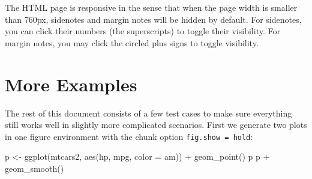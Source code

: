 \documentclass[]{tufte-handout}
\newenvironment{Shaded}{}{}
\newcommand{\AttributeTok}[1]{\textcolor[rgb]{0.49,0.56,0.16}{#1}}
\newcommand{\FunctionTok}[1]{\textcolor[rgb]{0.02,0.16,0.49}{#1}}
\newcommand{\NormalTok}[1]{#1}
\newcommand{\OtherTok}[1]{\textcolor[rgb]{0.00,0.44,0.13}{#1}}
\newcommand{\SpecialCharTok}[1]{\textcolor[rgb]{0.25,0.44,0.63}{#1}}
\begin{document}
The HTML page is responsive in the sense that when the page width is
smaller than 760px, sidenotes and margin notes will be hidden by
default. For sidenotes, you can click their numbers (the superscripts)
to toggle their visibility. For margin notes, you may click the circled
plus signs to toggle visibility.

\hypertarget{more-examples}{%
\section{More Examples}\label{more-examples}}

The rest of this document consists of a few test cases to make sure
everything still works well in slightly more complicated scenarios.
First we generate two plots in one figure environment with the chunk
option \texttt{fig.show\ =\ \textquotesingle{}hold\textquotesingle{}}:

\begin{Shaded}
\begin{Highlighting}[]
\NormalTok{p }\OtherTok{\textless{}{-}} \FunctionTok{ggplot}\NormalTok{(mtcars2, }\FunctionTok{aes}\NormalTok{(hp, mpg, }\AttributeTok{color =}\NormalTok{ am)) }\SpecialCharTok{+}
  \FunctionTok{geom\_point}\NormalTok{()}
\NormalTok{p}
\NormalTok{p }\SpecialCharTok{+} \FunctionTok{geom\_smooth}\NormalTok{()}
\end{Highlighting}
\end{Shaded}
\end{document}
